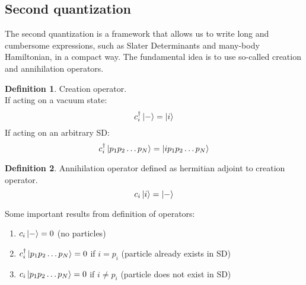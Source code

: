 \documentclass[twoside,english]{uiofysmaster}
\theoremstyle{definition}
\newtheorem{defn}{Definition}
\begin{document}
\subsection{Second quantization}
The second quantization is a framework that allows us to write long and cumbersome expressions, such as Slater Determinants and many-body Hamiltonian, in a compact way. The fundamental idea is to use so-called creation and annihilation operators.
\cite{umrigarObservationsVariationalProjector2015}
\begin{defn}
	Creation operator. \\
	If acting on a vacuum state:
	\begin{equation}
	c_i^\dagger\ket{-}=\ket{i}	
	\end{equation}
	If acting on an arbitrary SD:
	\begin{equation}
	c_i^\dagger\ket{p_1 p_2  \dots p_N}=\ket{i p_1p_2 \dots p_N}	
	\end{equation}
\end{defn}
\begin{defn}
	Annihilation operator defined as hermitian adjoint to creation operator. \\
		\begin{equation}
		c_i\ket{i}=\ket{-}	
		\end{equation}
\end{defn}
Some important results from definition of operators:
\begin{enumerate}
\item $c_i \ket{-}=0$ (no particles)
\item $c_i^\dagger\ket{p_1 p_2  \dots p_N}=0$ if $i=p_i$ (particle already exists in SD) 
\item $c_i\ket{p_1 p_2  \dots p_N}=0$ if $i\neq p_i$ (particle does not exist in SD) 
\end{enumerate}
\end{document}
